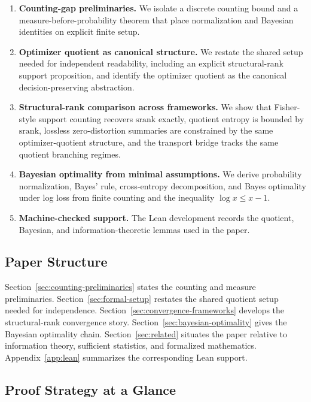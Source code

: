 \begin{enumerate}
\item \textbf{Counting-gap preliminaries.} We isolate a discrete counting bound and a measure-before-probability theorem that place normalization and Bayesian identities on explicit finite setup.

\item \textbf{Optimizer quotient as canonical structure.} We restate the shared setup needed for independent readability, including an explicit structural-rank support proposition, and identify the optimizer quotient as the canonical decision-preserving abstraction.

\item \textbf{Structural-rank comparison across frameworks.} We show that Fisher-style support counting recovers $\mathrm{srank}$ exactly, quotient entropy is bounded by $\mathrm{srank}$, lossless zero-distortion summaries are constrained by the same optimizer-quotient structure, and the transport bridge tracks the same quotient branching regimes.

\item \textbf{Bayesian optimality from minimal assumptions.} We derive probability normalization, Bayes' rule, cross-entropy decomposition, and Bayes optimality under log loss from finite counting and the inequality $\log x \le x - 1$.

\item \textbf{Machine-checked support.} The Lean development records the quotient, Bayesian, and information-theoretic lemmas used in the paper.
\end{enumerate}

\subsection{Paper Structure}

Section~\ref{sec:counting-preliminaries} states the counting and measure preliminaries. Section~\ref{sec:formal-setup} restates the shared quotient setup needed for independence. Section~\ref{sec:convergence-frameworks} develops the structural-rank convergence story. Section~\ref{sec:bayesian-optimality} gives the Bayesian optimality chain. Section~\ref{sec:related} situates the paper relative to information theory, sufficient statistics, and formalized mathematics. Appendix~\ref{app:lean} summarizes the corresponding Lean support.

\subsection{Proof Strategy at a Glance}

